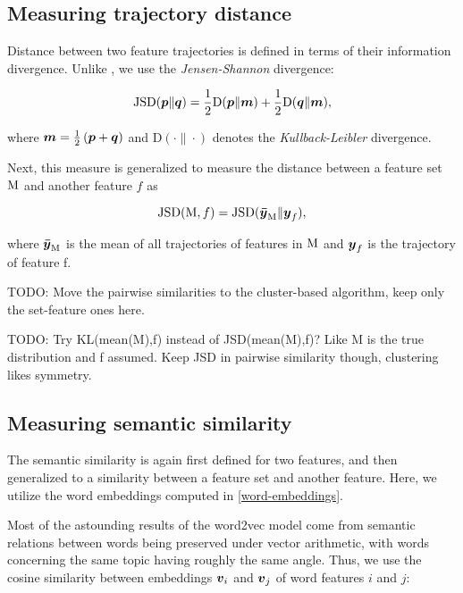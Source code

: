 \subsection{Measuring trajectory distance}

Distance between two feature trajectories is defined in terms of their information divergence. Unlike \cite{event-detection}, we use the \textit{Jensen-Shannon} divergence:

\begin{equation*}
	\featsim( \vect{p} \| \vect{q} ) = \frac{1}{2} \text{D}( \vect{p} \| \vect{m} ) + \frac{1}{2} \text{D}( \vect{q} \| \vect{m} ),
\end{equation*}

where $\vect{m} = \frac{1}{2} \left( \vect{p} + \vect{q} \right)$ and $\text{D}( \cdot \| \cdot )$ denotes the \textit{Kullback-Leibler} divergence.

Next, this measure is generalized to measure the distance between a feature set $\text{M}$ and another feature $f$ as

\begin{equation}
	\featsim( \featset, f ) = \featsim( \vect{\bar{\traj}}_{\featset} \| \vect{\traj}_{f} ),
\end{equation}

where $\vect{\bar{\traj}}_{\featset}$ is the mean of all trajectories of features in $\text{M}$ and $\vect{\traj}_{f}$ is the trajectory of feature f.

{\color{red} TODO: Move the pairwise similarities to the cluster-based algorithm, keep only the set-feature ones here.}

{\color{blue} TODO: Try KL(mean(M),f) instead of JSD(mean(M),f)? Like M is the true distribution and f assumed. Keep JSD in pairwise similarity though, clustering likes symmetry.}


\subsection{Measuring semantic similarity}

The semantic similarity is again first defined for two features, and then generalized to a similarity between a feature set and another feature. Here, we utilize the word embeddings computed in \ref{word-embeddings}.

Most of the astounding results of the word2vec model come from semantic relations between words being preserved under vector arithmetic, with words concerning the same topic having roughly the same angle. Thus, we use the cosine similarity between embeddings $\embed_{i}$ and $\embed_{j}$ of word features $i$ and $j$:

